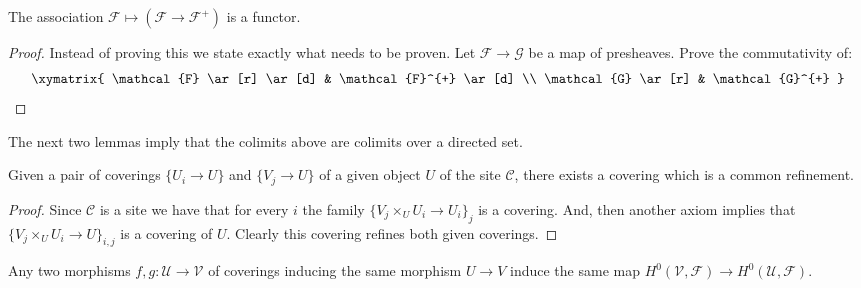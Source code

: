 \begin{lemma}
\label{lemma-plus-functorial}
The association $\mathcal{F} \mapsto
(\mathcal{F} \to \mathcal{F}^+)$
is a functor.
\end{lemma}

\begin{proof}
Instead of proving this we state exactly what needs to be proven.
Let $\mathcal{F} \to \mathcal{G}$ be a map of presheaves. Prove
the commutativity of:
$$
\xymatrix{
\mathcal{F} \ar[r] \ar[d]
&
\mathcal{F}^{+} \ar[d]
\\
\mathcal{G} \ar[r]
&
\mathcal{G}^{+}
}
$$
\end{proof}

\noindent
The next two lemmas imply that the colimits above are colimits
over a directed set.

\begin{lemma}
\label{lemma-common-refinement}
Given a pair of coverings $\{U_i \to U\}$
and $\{V_j \to U\}$ of a given object $U$ of the site
$\mathcal{C}$, there exists a covering which is a
common refinement.
\end{lemma}

\begin{proof}
Since $\mathcal{C}$ is a site we have that for every $i$ the
family $\{V_j \times_U U_i \to U_i\}_j$ is a covering.
And, then another axiom implies that $\{V_j \times_U U_i \to U\}_{i, j}$
is a covering of $U$. Clearly this covering refines both given
coverings.
\end{proof}

\begin{lemma}
\label{lemma-independent-refinement}
Any two morphisms $f, g: \mathcal{U} \to \mathcal{V}$ of coverings
inducing the same morphism $U \to V$ induce the same
map $H^0(\mathcal{V}, \mathcal{F}) \to  H^0(\mathcal{U}, \mathcal{F})$.
\end{lemma}

